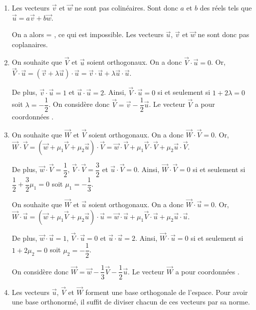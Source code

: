 \documentclass[11pt,fleqn, openany]{book} %
\begin{document}
\begin{solution}\hspace{0pt}

\begin{enumerate}
\item Les vecteurs $\vec v$ et $\vec w$ ne sont pas colinéaires. Sont donc $a$ et $b$ des réels tels que $\vec u=a\vec v+b\vec w$.

On a alors  = , ce qui est impossible. Les vecteurs $\vec u$, $\vec v$ et $\vec w$ ne sont donc pas coplanaires.

\item On souhaite que $\vec V$ et $\vec u$ soient orthogonaux. On a donc $\vec V \cdot \vec u = 0$. Or, $\vec V \cdot \vec u =(\vec v + \lambda \vec u) \cdot \vec u = \vec v \cdot \vec u + \lambda \vec u \cdot \vec u$.

De plus, $\vec v \cdot \vec u = 1$ et $\vec u \cdot \vec u =2$. Ainsi, $\vec V \cdot \vec u = 0$ si et seulement si $1+2\lambda = 0$ soit $\lambda = -\dfrac{1}{2}$. On considère donc $\vec V = \vec v - \dfrac{1}{2}\vec u$. Le vecteur $\vec V$ a pour coordonnées .

\item On souhaite que $\vec W$ et $\vec V$ soient orthogonaux. On a donc $\vec W \cdot \vec V = 0$. Or, $\vec W \cdot \vec V =(\vec w + \mu_1 \vec V + \mu_2 \vec u) \cdot \vec V = \vec w \cdot \vec V + \mu_1 \vec V \cdot \vec V + \mu_2 \vec u \cdot \vec V$.

De plus, $\vec w \cdot \vec V = \dfrac{1}{2}$, $\vec V \cdot \vec V = \dfrac{3}{2}$ et $\vec u \cdot \vec V =0$. Ainsi, $\vec W \cdot \vec V = 0$ si et seulement si $\dfrac{1}{2}+\dfrac{3}{2}\mu_1 = 0$ soit $\mu_1 = -\dfrac{1}{3}$. 

On souhaite que $\vec W$ et $\vec u$ soient orthogonaux. On a donc $\vec W \cdot \vec u = 0$. Or, $\vec W \cdot \vec u =(\vec w + \mu_1 \vec V + \mu_2 \vec u) \cdot \vec u = \vec w \cdot \vec u + \mu_1 \vec V \cdot \vec u + \mu_2 \vec u \cdot \vec u$.

De plus, $\vec w \cdot \vec u = 1$, $\vec V \cdot \vec u = 0$ et $\vec u \cdot \vec u =2$. Ainsi, $\vec W \cdot \vec u = 0$ si et seulement si $1+2\mu_2 = 0$ soit $\mu_2 = -\dfrac{1}{2}$. 

On considère donc $\vec W = \vec w - \dfrac{1}{3}\vec V - \dfrac{1}{2}\vec u$. Le vecteur $\vec W$ a pour coordonnées .

\item Les vecteurs $\vec u$, $\vec V$ et $\vec W$ forment une base orthogonale de l'espace. Pour avoir une base orthonormé, il suffit de diviser chacun de ces vecteurs par sa norme.
 \end{enumerate}\end{solution}
 
\end{document}
